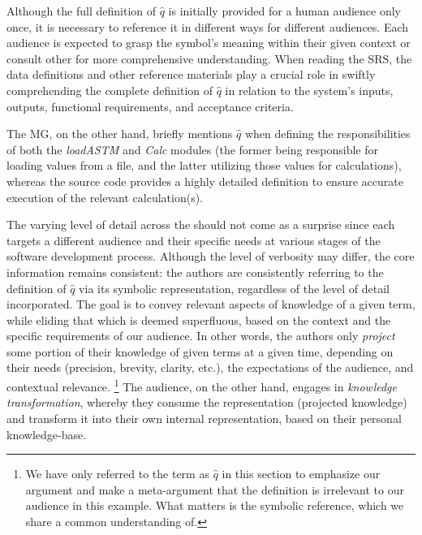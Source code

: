 Although the full definition of $\hat{q}$ is initially provided 
for a human audience only once, it is necessary to reference it in different 
ways for different audiences. Each audience is expected to grasp the symbol's 
meaning within their given context or consult other \sfs{} for more 
comprehensive understanding. When reading the SRS, the data definitions and 
other reference materials play a crucial role in swiftly comprehending the 
complete definition of $\hat{q}$ in relation to the system's inputs, outputs, 
functional requirements, and acceptance criteria.

The MG, on the other hand, briefly mentions $\hat{q}$ when defining the 
responsibilities of both the \emph{loadASTM} and \emph{Calc} modules (the 
former being responsible for loading values from a file, and the latter 
utilizing those values for calculations), whereas the source code provides a 
highly detailed definition to ensure accurate execution of the relevant 
calculation(s).

The varying level of detail across the \sfs{} should not come as a surprise 
since each \sf{} targets a different audience and their specific needs at 
various stages of the software development process. Although the level of 
verbosity may differ, the core information remains consistent: the authors are 
consistently referring to the definition of $\hat{q}$ via its symbolic 
representation, regardless of the level of detail incorporated. The goal is to 
convey relevant aspects of knowledge of a given term, while eliding that which 
is deemed superfluous, based on the context and the specific requirements of 
our audience. In other words, the authors only \emph{project} some portion of 
their knowledge of given terms at a given time, depending on their needs 
(precision, brevity, clarity, etc.), the expectations of the audience, and 
contextual relevance. \footnote{We have only referred to the term as $\hat{q}$ 
in this section to emphasize our argument and make a meta-argument that the 
definition is irrelevant to our audience in this example. What matters is the 
symbolic reference, which we share a common understanding of.} The audience, on 
the other hand, engages in \emph{knowledge transformation}, whereby they 
consume the representation (projected knowledge) and transform it into their 
own internal representation, based on their personal knowledge-base.

